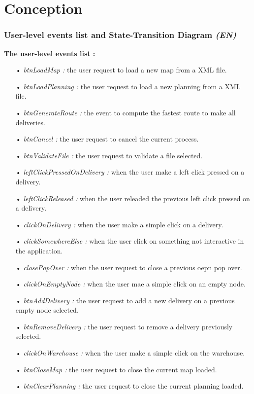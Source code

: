 \documentclass[paper=a4, fontsize=11pt]{report}
\numberwithin{equation}{section}		%
\numberwithin{figure}{section}		%
\numberwithin{table}{section}		%
\renewcommand{\bf}[1]{\textbf{#1}}
\renewcommand{\it}[1]{\textit{#1}}
\newcommand{\Todo}[1]{\todo[inline]{#1}}
\begin{document}
\part{Conception}
\label{part:conception}

\section{User-level events list and State-Transition Diagram \it{(EN)}}
\label{sec:user-level-events-list-and-state-transition-diagram}

\Todo{We should add a comment here}

\bf{The user-level events list :}
\begin{itemize}
  \item[•] \it{btnLoadMap :} the user request to load a new map from a XML file.
  \item[•] \it{btnLoadPlanning :} the user request to load a new planning from a XML file.
  \item[•] \it{btnGenerateRoute :} the event to compute the fastest route to make all deliveries.
  \item[•] \it{btnCancel :} the user request to cancel the current process.
  \item[•] \it{btnValidateFile :} the user request to validate a file selected.
  \item[•] \it{leftClickPressedOnDelivery :} when the user make a left click pressed on a delivery.
  \item[•] \it{leftClickReleased :} when the user releaded the previous left click pressed on a delivery.
  \item[•] \it{clickOnDelivery :} when the user make a simple click on a delivery.
  \item[•] \it{clickSomewhereElse :} when the user click on something not interactive in the application.
  \item[•] \it{closePopOver :} when the user request to close a previous oepn pop over.
  \item[•] \it{clickOnEmptyNode :} when the user mae a simple click on an empty node.
  \item[•] \it{btnAddDelivery :} the user request to add a new delivery on a previous empty node selected.
  \item[•] \it{btnRemoveDelivery :} the user request to remove a delivery previously selected.
  \item[•] \it{clickOnWarehouse :} when the user make a simple click on the warehouse.
  \item[•] \it{btnCloseMap :} the user request to close the current map loaded.
  \item[•] \it{btnClearPlanning :} the user request to close the current planning loaded.
\end{itemize}
\end{document}
